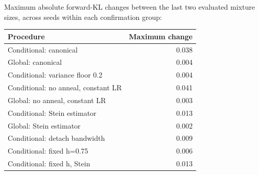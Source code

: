 \documentclass[11pt,a4paper]{article}
\numberwithin{equation}{section}
\begin{document}
Maximum absolute forward-KL changes between the last two evaluated mixture
sizes, across seeds within each confirmation group:
\begin{center}\small
\begin{tabular}{p{9cm}r}\toprule
Procedure & Maximum change\\\midrule
Conditional: canonical & 0.038 \\
Global: canonical & 0.004 \\
Conditional: variance floor 0.2 & 0.004 \\
Conditional: no anneal, constant LR & 0.041 \\
Global: no anneal, constant LR & 0.003 \\
Conditional: Stein estimator & 0.013 \\
Global: Stein estimator & 0.002 \\
Conditional: detach bandwidth & 0.009 \\
Conditional: fixed h=0.75 & 0.006 \\
Conditional: fixed h, Stein & 0.013 \\
\bottomrule\end{tabular}
\end{center}

\appendix
\end{document}
